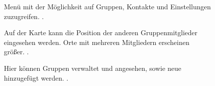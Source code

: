 \documentclass[parskip=full,11pt,twoside]{scrartcl}
\begin{document}
\begin{figure}[hb]
	\caption{\label{fig:menu}
		Menü mit der Möglichkeit auf Gruppen, Kontakte und Einstellungen zuzugreifen.
		 .
	}
\end{figure}

\begin{figure}[hb]
		\caption{\label{fig:map}
			Auf der Karte kann die Position der anderen Gruppenmitglieder eingesehen werden.
			Orte mit mehreren Mitgliedern erscheinen größer. 
			.
		}
\end{figure}

\begin{figure}[hb]
		\caption{\label{fig:groups}
			Hier können Gruppen verwaltet und angesehen, sowie neue hinzugefügt werden.
			.
		}
\end{figure}
\end{document}
